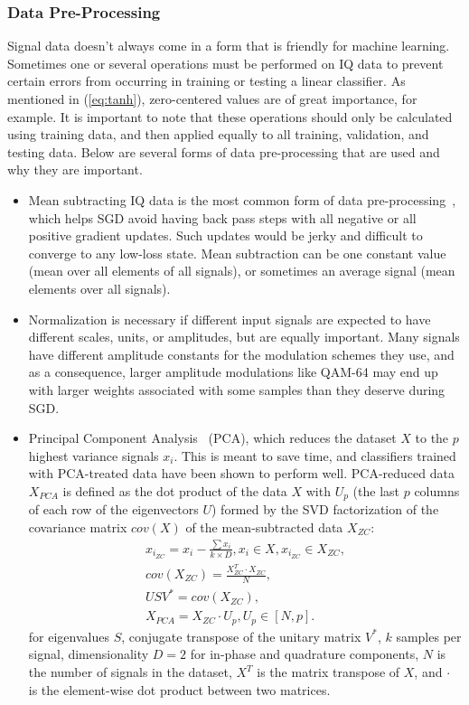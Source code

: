 \subsubsection{Data Pre-Processing}
Signal data doesn't always come in a form that is friendly for machine learning. Sometimes one or several operations must be performed on IQ data to prevent certain errors from occurring in training or testing a linear classifier. As mentioned in (\ref{eq:tanh}), zero-centered values are of great importance, for example. It is important to note that these operations should only be calculated using training data, and then applied equally to all training, validation, and testing data. Below are several forms of data pre-processing that are used and why they are important.
\begin{itemize}
\item Mean subtracting IQ data is the most common form of data pre-processing~\cite{cs231}, which helps SGD avoid having back pass steps with all negative or all positive gradient updates. Such updates would be jerky and difficult to converge to any low-loss state. Mean subtraction can be one constant value (mean over all elements of all signals), or sometimes an average signal (mean elements over all signals).
\item Normalization is necessary if different input signals are expected to have different scales, units, or amplitudes, but are equally important. Many signals have different amplitude constants for the modulation schemes they use, and as a consequence, larger amplitude modulations like QAM-64 may end up with larger weights associated with some samples than they deserve during SGD.
\item Principal Component Analysis~\cite{pca} (PCA), which reduces the dataset $X$ to the $p$ highest variance signals $x_i$. This is meant to save time, and classifiers trained with PCA-treated data have been shown to perform well. PCA-reduced data $X_{PCA}$ is defined as the dot product of the data $X$ with $U_p$ (the last $p$ columns of each row of the eigenvectors $U$) formed by the SVD factorization of the covariance matrix $cov(X)$ of the mean-subtracted data $X_{ZC}$:
\begin{subequations}
\label{eq:pca}
\begin{align}
x_{i_{ZC}} = x_i - \frac{\sum x_i}{k \times D}, x_i \in X, x_{i_{ZC}} \in X_{ZC},
\\
cov(X_{ZC}) = \frac{X_{ZC}^T\cdot X_{ZC}}{N},
\\
U S V^* = cov(X_{ZC}),
\\
X_{PCA} = X_{ZC} \cdot U_p, U_p \in [ N, p ].
\end{align}
\end{subequations}
for eigenvalues $S$, conjugate transpose of the unitary matrix $V^*$, $k$ samples per signal, dimensionality $D=2$ for in-phase and quadrature components, $N$ is the number of signals in the dataset, $X^T$ is the matrix transpose of $X$, and $\cdot$ is the element-wise dot product between two matrices.
\end{itemize}

